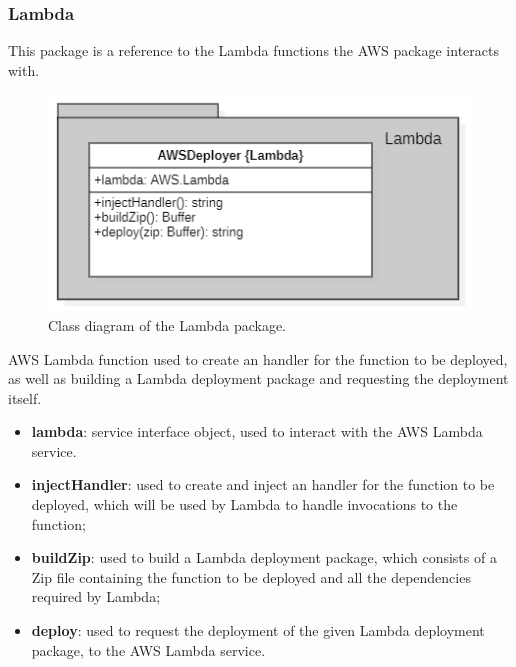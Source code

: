	\subsubsection{Lambda}
	This package is a reference to the Lambda functions the AWS package interacts with.
	\begin{figure} [h!]
		\centering
		\includegraphics[width=0.7\linewidth]{diagrammi/etherless-server/Lambda}
		\caption{Class diagram of the Lambda package.}
	\end{figure}
	AWS Lambda function used to create an handler for the function to be deployed, as well as building a Lambda deployment package and requesting the deployment itself.
	\begin{itemize}
		\item \textbf{lambda}: service interface object, used to interact with the AWS Lambda service.
	\end{itemize}
	\begin{itemize}
		\item \textbf{injectHandler}: used to create and inject an handler for the function to be deployed, which will be used by Lambda to handle invocations to the function;
		\item \textbf{buildZip}: used to build a Lambda deployment package, which consists of a Zip file containing the function to be deployed and all the dependencies required by Lambda;
		\item \textbf{deploy}: used to request the deployment of the given Lambda deployment package, to the AWS Lambda service.
	\end{itemize}

